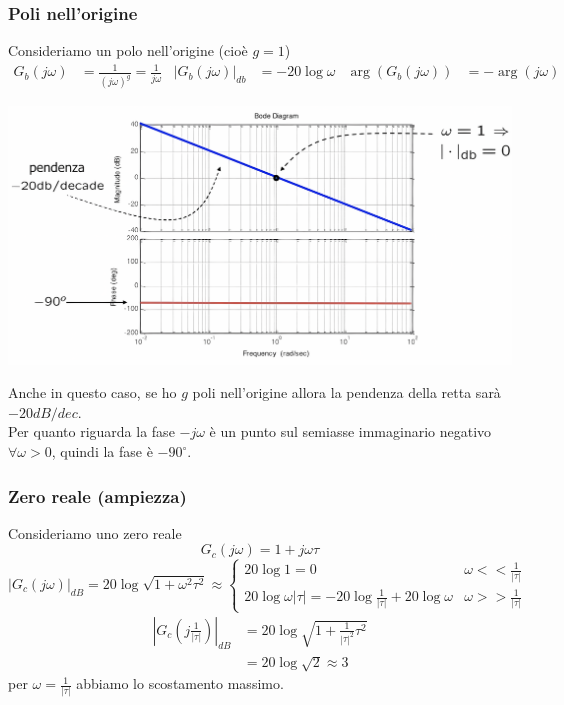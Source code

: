 \documentclass{article}
\numberwithin{equation}{subsection}
\begin{document}
\subsubsection{Poli nell'origine}
Consideriamo un polo nell'origine (cioè $g=1$)
\begin{align*}
    G_b(j\omega) &= \frac{1}{(j\omega)^g} = \frac{1}{j\omega} & |G_b(j\omega)|_{db} &= -20 \log \omega & \arg(G_b(j \omega)) &= -\arg(j\omega)
\end{align*}
\begin{center}
    \includegraphics[scale=0.125]{Images/Diagramma_poli_origine.png}
\end{center}
Anche in questo caso, se ho $g$ poli nell'origine allora la pendenza della retta sarà $-20  dB/dec$.\\
Per quanto riguarda la fase $-j \omega$ è un punto sul semiasse immaginario negativo $\forall \omega>0$, quindi la fase è $-90^\circ$.



\subsubsection{Zero reale (ampiezza)}
Consideriamo uno zero reale
\[
    G_c(j\omega) = 1 + j \omega \tau  
\]
\[
    |G_c(j\omega)|_{dB} = 20 \log \sqrt{1 + \omega^2\tau^2} \approx
    \begin{cases}
        20 \log 1 = 0 &\omega << \frac{1}{|\tau|}\\
        20 \log \omega |\tau| = -20 \log \frac{1}{|\tau|} + 20 \log \omega &\omega >> \frac{1}{|\tau|}
    \end{cases}
\]
\begin{align*}
    |G_c\left(j \frac{1}{|\tau|} \right)|_{dB} &= 20 \log \sqrt{1+\frac{1}{|\tau|^2}\tau^2}\\
    &= 20 \log \sqrt{2} \approx 3
\end{align*}
per $\omega = \frac{1}{|\tau|}$ abbiamo lo scostamento massimo.
\end{document}
